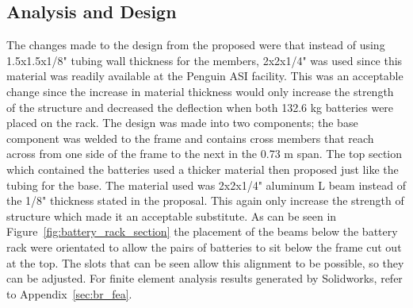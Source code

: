 \subsection{Analysis and Design}
The changes made to the design from the proposed were that instead of using 1.5x1.5x1/8" tubing wall thickness for the members, 2x2x1/4" was used since this material was readily available at the Penguin ASI facility. This was an acceptable change since the increase in material thickness would only increase the strength of the structure and decreased the deflection when both 132.6 kg batteries were placed on the rack. The design was made into two components; the base component was welded to the frame and contains cross members that reach across from one side of the frame to the next in the 0.73 m span. The top section which contained the batteries used a thicker material then proposed just like the tubing for the base. The material used was 2x2x1/4" aluminum L beam instead of the 1/8" thickness stated in the proposal. This again only increase the strength of structure which made it an acceptable substitute. As can be seen in Figure~\ref{fig:battery_rack_section} the placement of the beams below the battery rack were orientated to allow the pairs of batteries to sit below the frame cut out at the top. The slots that can be seen allow this alignment to be possible, so they can be adjusted. For finite element analysis results generated by Solidworks, refer to Appendix~\ref{sec:br_fea}.




